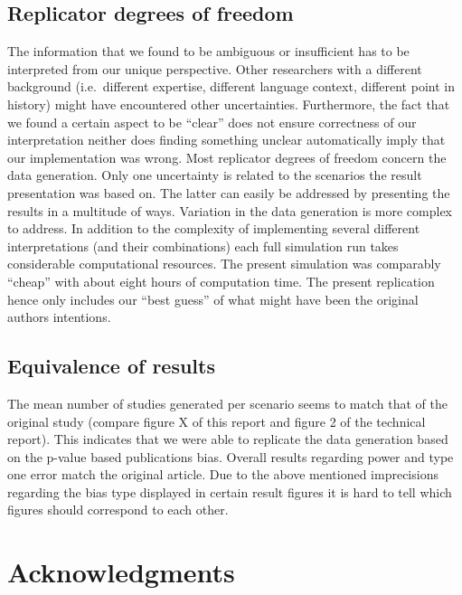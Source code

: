 \documentclass[
  english,
  doc,floatsintext,draftall]{apa6}
\begin{document}
\hypertarget{replicator-degrees-of-freedom-1}{%
\subsection{Replicator degrees of freedom}\label{replicator-degrees-of-freedom-1}}

The information that we found to be ambiguous or insufficient has to be interpreted from our unique perspective.
Other researchers with a different background (i.e.~different expertise, different language context, different point in history) might have encountered other uncertainties.
Furthermore, the fact that we found a certain aspect to be \enquote{clear} does not ensure correctness of our interpretation neither does finding something unclear automatically imply that our implementation was wrong.
Most replicator degrees of freedom concern the data generation.
Only one uncertainty is related to the scenarios the result presentation was based on.
The latter can easily be addressed by presenting the results in a multitude of ways.
Variation in the data generation is more complex to address.
In addition to the complexity of implementing several different interpretations (and their combinations) each full simulation run takes considerable computational resources.
The present simulation was comparably \enquote{cheap} with about eight hours of computation time.
The present replication hence only includes our \enquote{best guess} of what might have been the original authors intentions.

\hypertarget{equivalence-of-results}{%
\subsection{Equivalence of results}\label{equivalence-of-results}}

The mean number of studies generated per scenario seems to match that of the original study (compare figure X of this report and figure 2 of the technical report).
This indicates that we were able to replicate the data generation based on the p-value based publications bias.
Overall results regarding power and type one error match the original article.
Due to the above mentioned imprecisions regarding the bias type displayed in certain result figures it is hard to tell which figures should correspond to each other.

\hypertarget{acknowledgments}{%
\section{Acknowledgments}\label{acknowledgments}}
\end{document}
